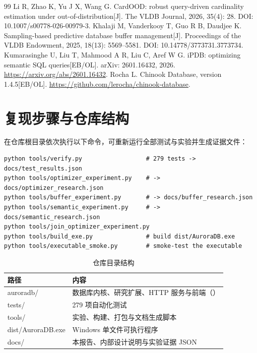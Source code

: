 \documentclass[a4paper,zihao=-4,UTF8,fontset=windows,linespread=1.35]{ctexart}
\newcommand{\fn}[1]{\texttt{\detokenize{#1}}}
\begin{document}
\begin{thebibliography}{99}
 Li R, Zhao K, Yu J X, Wang G. CardOOD: robust query-driven cardinality estimation under out-of-distribution[J]. The VLDB Journal, 2026, 35(4): 28. DOI: 10.1007/s00778-026-00979-3.
 Khalaji M, Vanderkooy T, Guo R B, Daudjee K. Sampling-based predictive database buffer management[J]. Proceedings of the VLDB Endowment, 2025, 18(13): 5569--5581. DOI: 10.14778/3773731.3773734.
 Kumarasinghe U, Liu T, Mahmood A R, Liu C, Aref W G. iPDB: optimizing semantic SQL queries[EB/OL]. arXiv: 2601.16432, 2026. \url{https://arxiv.org/abs/2601.16432}.
 Rocha L. Chinook Database, version 1.4.5[EB/OL]. \url{https://github.com/lerocha/chinook-database}.
\end{thebibliography}

\appendix
\section{复现步骤与仓库结构}
在仓库根目录依次执行以下命令，可重新运行全部测试与实验并生成证据文件：
\begin{lstlisting}[style=py]
python tools/verify.py                  # 279 tests -> docs/test_results.json
python tools/optimizer_experiment.py    # -> docs/optimizer_research.json
python tools/buffer_experiment.py       # -> docs/buffer_research.json
python tools/semantic_experiment.py     # -> docs/semantic_research.json
python tools/join_optimizer_experiment.py
python tools/build_exe.py               # build dist/AuroraDB.exe
python tools/executable_smoke.py        # smoke-test the executable
\end{lstlisting}

\begin{table}[!htb]
\centering\small
\caption{仓库目录结构}
\begin{tabularx}{\textwidth}{>{\ttfamily}p{4.2cm}X}
\toprule
\normalfont 路径 & 内容 \\
\midrule
auroradb/ & 数据库内核、研究扩展、HTTP 服务与前端（\fn{web/}） \\
tests/ & 279 项自动化测试 \\
tools/ & 实验、构建、打包与文档生成脚本 \\
dist/AuroraDB.exe & Windows 单文件可执行程序 \\
docs/ & 本报告、内部设计说明与实验证据 JSON \\
\bottomrule
\end{tabularx}
\end{table}
\end{document}
